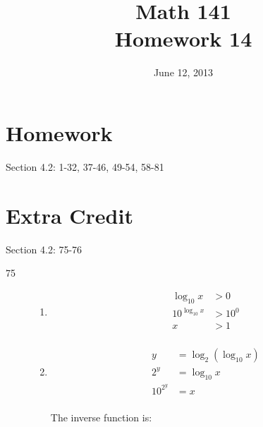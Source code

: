\documentclass{exam}
\date{June 12, 2013}
\author{}
\title{Math 141 \\ Homework 14}
\begin{document}
  \maketitle

  \section{Homework}

  Section 4.2: 1-32, 37-46, 49-54, 58-81

 \section{Extra Credit}
  Section 4.2: 75-76

  \ifprintanswers
    \begin{description}
      \item[75]
        \begin{enumerate}[a]

          \item 
            \begin{align*}
              \log_{10} x      & > 0 \\
              10^{\log_{10} x} & > 10^0 \\
              x                & > 1 \\
            \end{align*}


          \item 
            \begin{align*}
              y        &= \log_2 (\log_{10} x) \\
              2^y      &= \log_{10} x \\
              10^{2^y} &= x \\
            \end{align*}

            The inverse function is: 



\end{enumerate}
\end{description}
\end{document}
